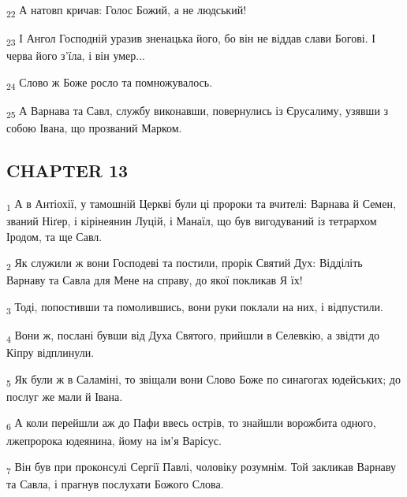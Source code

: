 \begin{tcolorbox}
\textsubscript{22} А натовп кричав: Голос Божий, а не людський!
\end{tcolorbox}
\begin{tcolorbox}
\textsubscript{23} І Ангол Господній уразив зненацька його, бо він не віддав слави Богові. І черва його з'їла, і він умер...
\end{tcolorbox}
\begin{tcolorbox}
\textsubscript{24} Слово ж Боже росло та помножувалось.
\end{tcolorbox}
\begin{tcolorbox}
\textsubscript{25} А Варнава та Савл, службу виконавши, повернулись із Єрусалиму, узявши з собою Івана, що прозваний Марком.
\end{tcolorbox}
\subsection{CHAPTER 13}
\begin{tcolorbox}
\textsubscript{1} А в Антіохії, у тамошній Церкві були ці пророки та вчителі: Варнава й Семен, званий Ніґер, і кірінеянин Луцій, і Манаїл, що був вигодуваний із тетрархом Іродом, та ще Савл.
\end{tcolorbox}
\begin{tcolorbox}
\textsubscript{2} Як служили ж вони Господеві та постили, прорік Святий Дух: Відділіть Варнаву та Савла для Мене на справу, до якої покликав Я їх!
\end{tcolorbox}
\begin{tcolorbox}
\textsubscript{3} Тоді, попостивши та помолившись, вони руки поклали на них, і відпустили.
\end{tcolorbox}
\begin{tcolorbox}
\textsubscript{4} Вони ж, послані бувши від Духа Святого, прийшли в Селевкію, а звідти до Кіпру відплинули.
\end{tcolorbox}
\begin{tcolorbox}
\textsubscript{5} Як були ж в Саламіні, то звіщали вони Слово Боже по синагогах юдейських; до послуг же мали й Івана.
\end{tcolorbox}
\begin{tcolorbox}
\textsubscript{6} А коли перейшли аж до Пафи ввесь острів, то знайшли ворожбита одного, лжепророка юдеянина, йому на ім'я Варісус.
\end{tcolorbox}
\begin{tcolorbox}
\textsubscript{7} Він був при проконсулі Сергії Павлі, чоловіку розумнім. Той закликав Варнаву та Савла, і прагнув послухати Божого Слова.
\end{tcolorbox}
